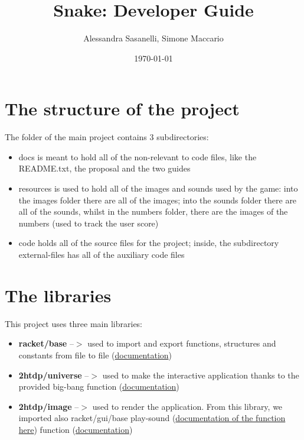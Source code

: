 \documentclass{article}
\title{Snake: Developer Guide}
\author{Alessandra Sasanelli, Simone Maccario}
\date{\today}
\begin{document}
	\maketitle
	
	\section{The structure of the project}
	The folder of the main project contains 3 subdirectories: 
	\begin{itemize}
		\item docs is meant to hold all of the non-relevant to code files, like the README.txt, the proposal and the two guides
		\item resources is used to hold all of the images and sounds used by the game: into the images folder there are all of the images; into the sounds folder there are all of the sounds, whilst in the numbers folder, there are the images of the numbers (used to track the user score)
		\item code holds all of the source files for the project; inside, the subdirectory external-files has all of the auxiliary code files
	\end{itemize}
	
	\section{The libraries}	
	This project uses three main libraries:
	\begin{itemize}
		\item \textbf{racket/base} --$>$ used to import and export functions, structures and constants from file to file 
		(\href{https://docs.racket-lang.org/reference/index.html}{documentation})
		\item \textbf{2htdp/universe} --$>$ used to make the interactive application thanks to the provided big-bang function 
		(\href{https://docs.racket-lang.org/teachpack/2htdpuniverse.html}{documentation})
		\item \textbf{2htdp/image} --$>$ used to render the application. From this library, we imported also racket/gui/base play-sound (\href{https://docs.racket-lang.org/gui/Windowing_Functions.html#\%28def._\%28\%28lib._mred\%2Fmain..rkt\%29._play-sound\%29\%29}{documentation of the function here}) function 	
		(\href{https://docs.racket-lang.org/teachpack/2htdpimage.html}{documentation})
	\end{itemize}
	
\end{document}
